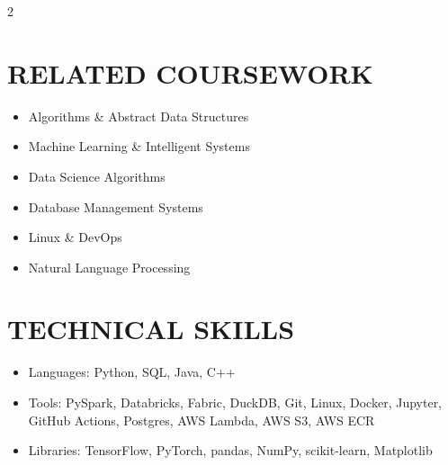 \documentclass[11pt, a4paper, roman]{moderncv}
\begin{document}
\begin{multicols}{2}
\section{RELATED COURSEWORK}
{\begin{itemize}
    \item Algorithms \& Abstract Data Structures
    \item Machine Learning \& Intelligent Systems
    \item Data Science Algorithms
    \item Database Management Systems
    \item Linux \& DevOps
    \item Natural Language Processing
  \end{itemize}
}

\columnbreak

\section{TECHNICAL SKILLS}
{\begin{itemize}
    \item Languages: Python, SQL, Java, C++
    \item Tools: PySpark, Databricks, Fabric, DuckDB, Git, Linux, Docker, Jupyter, GitHub Actions, Postgres, AWS Lambda, AWS S3, AWS ECR
    \item Libraries: TensorFlow, PyTorch, pandas, NumPy, scikit-learn, Matplotlib
  \end{itemize}
}
\end{multicols}
\end{document}
